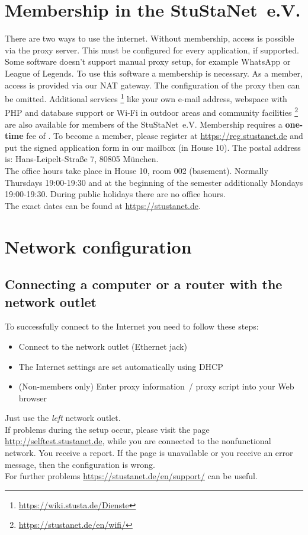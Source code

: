\documentclass[a4paper,12pt]{scrartcl}
\begin{document}
\section*{Membership in the StuStaNet~e.V.}
There are two ways to use the internet. Without membership, access is possible via the proxy server. This must be configured for every application, if supported. Some software doesn't support manual proxy setup, for example WhatsApp or League of Legends.
To use this software a membership is necessary.
\pagebreak\linebreak
As a member, access is provided via our NAT gateway. The configuration of the proxy then can be omitted. Additional services \footnote{\url{https://wiki.stusta.de/Dienste}} like your own e-mail address, webspace with PHP and database support or Wi-Fi in outdoor areas and community facilities \footnote{\url{https://stustanet.de/en/wifi/}} are also available for members of the StuStaNet~e.V. Membership requires a \textbf{one-time} fee of . To become a member, please register at \mbox{\url{https://reg.stustanet.de}} and put the signed application form in our mailbox (in House 10). The postal address is: Hans-Leipelt-Straße 7, 80805 München.
\\
The office hours take place in House 10, room 002 (basement). Normally Thursdays 19:00-19:30 and at the beginning of the semester additionally Mondays 19:00-19:30. During public holidays there are no office hours.
\\
The exact dates can be found at \mbox{\url{https://stustanet.de}}.


\section*{Network configuration}
\subsection*{Connecting a computer or a router with the network outlet}

To successfully connect to the Internet you need to follow these steps:
\begin{itemize}
    \item Connect to the network outlet (Ethernet jack)
    \item The Internet settings are set automatically using DHCP
    \item (Non-members only) Enter proxy information~/ proxy script into your Web browser
\end{itemize}
Just use the \emph{left} network outlet.\\
If problems during the setup occur, please visit the page \mbox{\url{http://selftest.stustanet.de}}, while you are connected to the nonfunctional network. You receive a report. If the page is unavailable or you receive an error message, then the configuration is wrong.\\
For further problems \mbox{\url{https://stustanet.de/en/support/}} can be useful.
\end{document}
